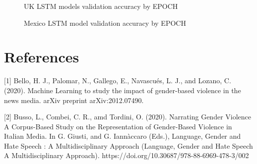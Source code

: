\documentclass{article}
\begin{document}
\begin{figure}[H]
	\caption{\label{fig:my-label1} UK LSTM models validation accuracy by EPOCH}
\end{figure}

\begin{figure}[H]
	\caption{\label{fig:my-label1} Mexico LSTM model validation accuracy by EPOCH}
\end{figure}


\newpage

\section{References}\label{sec_ref}

[1] Bello, H. J., Palomar, N., Gallego, E., Navascués, L. J., and Lozano, C. (2020). Machine Learning to study the impact of gender-based violence in the news media. arXiv preprint arXiv:2012.07490.

[2] Busso, L., Combei, C. R., amd Tordini, O. (2020). Narrating Gender Violence A Corpus-Based Study on the Representation of Gender-Based Violence in Italian Media. In G. Giusti, and G. Iannàccaro (Eds.), Language, Gender and Hate Speech : A Multidisciplinary Approach (Language, Gender and Hate Speech A Multidisciplinary Approach). https://doi.org/10.30687/978-88-6969-478-3/002
\end{document}

